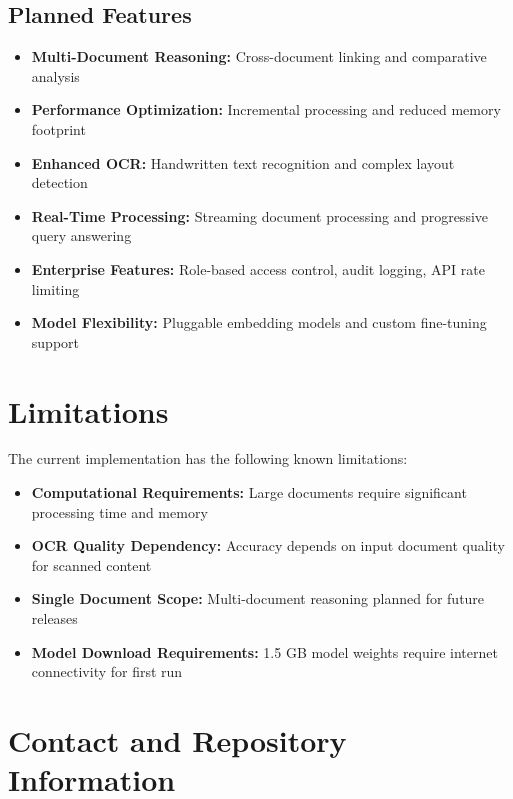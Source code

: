 \documentclass[11pt,a4paper]{article}
\begin{document}
\subsection{Planned Features}

\begin{itemize}[leftmargin=*]
    \item \textbf{Multi-Document Reasoning:} Cross-document linking and comparative analysis
    \item \textbf{Performance Optimization:} Incremental processing and reduced memory footprint
    \item \textbf{Enhanced OCR:} Handwritten text recognition and complex layout detection
    \item \textbf{Real-Time Processing:} Streaming document processing and progressive query answering
    \item \textbf{Enterprise Features:} Role-based access control, audit logging, API rate limiting
    \item \textbf{Model Flexibility:} Pluggable embedding models and custom fine-tuning support
\end{itemize}

\clearpage
\section{Limitations}

The current implementation has the following known limitations:

\begin{itemize}[leftmargin=*]
    \item \textbf{Computational Requirements:} Large documents require significant processing time and memory
    \item \textbf{OCR Quality Dependency:} Accuracy depends on input document quality for scanned content
    \item \textbf{Single Document Scope:} Multi-document reasoning planned for future releases
    \item \textbf{Model Download Requirements:} 1.5 GB model weights require internet connectivity for first run
\end{itemize}

\clearpage
\section{Contact and Repository Information}
\end{document}
